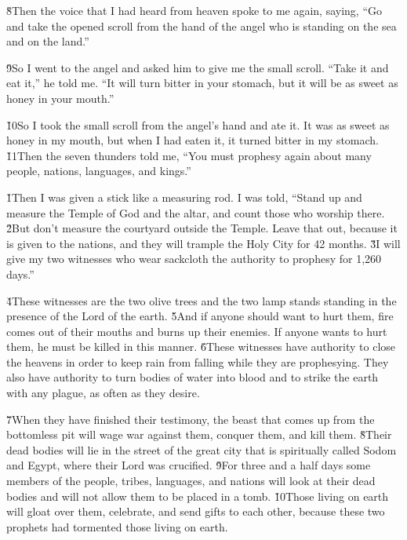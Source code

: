 \v{8}Then the voice that I had heard from heaven spoke to me again, saying, ``Go and take the opened scroll from the hand of the angel who is standing on the sea and on the land.''

\v{9}So I went to the angel and asked him to give me the small scroll. ``Take it and eat it,'' he told me. ``It will turn bitter in your stomach, but it will be as sweet as honey in your mouth.''

\v{10}So I took the small scroll from the angel's hand and ate it. It was as sweet as honey in my mouth, but when I had eaten it, it turned bitter in my stomach. \v{11}Then the seven thunders told me, ``You must prophesy again about many people, nations, languages, and kings.''

\v{1}Then I was given a stick like a measuring rod. I was told, ``Stand up and measure the Temple of God and the altar, and count those who worship there. \v{2}But don't measure the courtyard outside the Temple. Leave that out, because it is given to the nations, and they will trample the Holy City for 42 months. \v{3}I will give my two witnesses who wear sackcloth the authority to prophesy for 1,260 days.''

\v{4}These witnesses are the two olive trees and the two lamp stands standing in the presence of the Lord of the earth. \v{5}And if anyone should want to hurt them, fire comes out of their mouths and burns up their enemies. If anyone wants to hurt them, he must be killed in this manner. \v{6}These witnesses have authority to close the heavens in order to keep rain from falling while they are prophesying. They also have authority to turn bodies of water into blood and to strike the earth with any plague, as often as they desire.

\v{7}When they have finished their testimony, the beast that comes up from the bottomless pit will wage war against them, conquer them, and kill them. \v{8}Their dead bodies will lie in the street of the great city that is spiritually called Sodom and Egypt, where their Lord was crucified. \v{9}For three and a half days some members of the people, tribes, languages, and nations will look at their dead bodies and will not allow them to be placed in a tomb. \v{10}Those living on earth will gloat over them, celebrate, and send gifts to each other, because these two prophets had tormented those living on earth.

